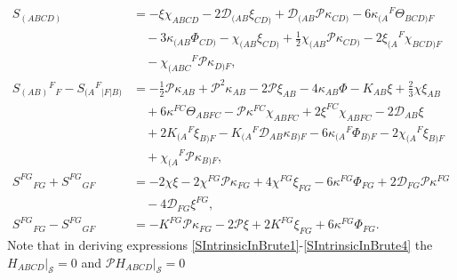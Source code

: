 \documentclass[10pt,a4paper]{article}
\theoremstyle{plain}
\begin{document}
\begin{subequations}
\begin{align}
S_{(ABCD)} &= - \xi \chi_{ABCD} -2 \mathcal{D}_{(AB}\xi_{CD)} +
\mathcal{D}_{(AB}\mathcal{P}\kappa_{CD)}-6
\kappa_{(A}{}^{F}\Theta_{BCD)F} \nonumber \\ & \quad -3
\kappa_{(AB}\Phi_{CD)} - \chi_{(AB}\xi_{CD)} + \tfrac{1}{2}
\chi_{(AB}\mathcal{P} \kappa_{CD)} -2 \xi_{(A}{}^{F}\chi_{BCD)F}
\nonumber \\ & \quad - \chi_{(ABC}{}^{F}\mathcal{P}\kappa_{D)F},
\label{SIntrinsicInBrute1}
\\
S_{(AB)}{}^{F}{}_{F} - S_{(A}{}^{F}{}_{|F|B)} & =
-\tfrac{1}{2}\mathcal{P}\kappa_{AB} +
\mathcal{P}^2\kappa_{AB}-2\mathcal{P}\xi_{AB}-4 \kappa_{AB} \Phi -
K_{AB} \xi + \tfrac{2}{3} \chi \xi_{AB} \nonumber \\ & \quad+ 6
\kappa^{FC} \Theta_{ABFC}-\mathcal{P}\kappa^{FC}\chi_{ABFC} + 2
\xi^{FC} \chi_{ABFC} -2 \mathcal{D}_{AB}\xi \nonumber \\ & \quad + 2
K_{(A}{}^{F}\xi_{B)F} - K_{(A}{}^{F}\mathcal{D}_{AB}\kappa_{B)F}-6
\kappa_{(A}{}^{F}\Phi_{B)F} -2 \chi_{(A}{}^{F}\xi_{B)F} \nonumber \\ &
\quad+
\chi_{(A}{}^{F}\mathcal{P}\kappa_{B)F}, \label{SIntrinsicInBrute2} \\
S^{FG}{}_{FG} + S^{FG}{}_{GF} & = -2 \chi \xi
-2\chi^{FG}\mathcal{P}\kappa_{FG} + 4 \chi^{FG} \xi_{FG} -6
\kappa^{FG} \Phi_{FG} + 2 \mathcal{D}_{FG}\mathcal{P}\kappa^{FG}
\nonumber \\ & \quad - 4
\mathcal{D}_{FG}\xi^{FG}, \label{SIntrinsicInBrute3} \\
S^{FG}{}_{FG} - S^{FG}{}_{GF} &= - K^{FG}
\mathcal{P}\kappa_{FG}-2\mathcal{P}\xi+ 2 K^{FG} \xi_{FG} + 6
\kappa^{FG} \Phi_{FG}.
\label{SIntrinsicInBrute4}
\end{align}
\end{subequations}
Note that in deriving expressions
\eqref{SIntrinsicInBrute1}-\eqref{SIntrinsicInBrute4} the
$H_{ABCD}|_{\mathcal{S}}=0$ and $\mathcal{P}H_{ABCD}|_{\mathcal{S}}=0$
\end{document}
